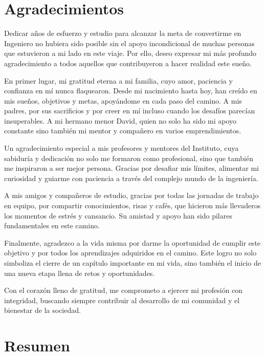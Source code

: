 \documentclass{report}
\begin{document}
	\newpage
	\chapter*{Agradecimientos}
	
	Dedicar años de esfuerzo y estudio para alcanzar la meta de convertirme en Ingeniero no hubiera sido posible sin el apoyo incondicional de muchas personas que estuvieron a mi lado en este viaje. Por ello, deseo expresar mi más profundo agradecimiento a todos aquellos que contribuyeron a hacer realidad este sueño.
	
	En primer lugar, mi gratitud eterna a mi familia, cuyo amor, paciencia y confianza en mí nunca flaquearon. Desde mi nacimiento hasta hoy, han creído en mis sueños, objetivos y metas, apoyándome en cada paso del camino. A mis padres, por sus sacrificios y por creer en mí incluso cuando los desafíos parecían insuperables. A mi hermano menor David, quien no solo ha sido mi apoyo constante sino también mi mentor y compañero en varios emprendimientos.
	
	Un agradecimiento especial a mis profesores y mentores del Instituto, cuya sabiduría y dedicación no solo me formaron como profesional, sino que también me inspiraron a ser mejor persona. Gracias por desafiar mis límites, alimentar mi curiosidad y guiarme con paciencia a través del complejo mundo de la ingeniería.
	
	A mis amigos y compañeros de estudio, gracias por todas las jornadas de trabajo en equipo, por compartir conocimientos, risas y cafés, que hicieron más llevaderos los momentos de estrés y cansancio. Su amistad y apoyo han sido pilares fundamentales en este camino.
	
	Finalmente, agradezco a la vida misma por darme la oportunidad de cumplir este objetivo y por todos los aprendizajes adquiridos en el camino. Este logro no solo simboliza el cierre de un capítulo importante en mi vida, sino también el inicio de una nueva etapa llena de retos y oportunidades.
	
	Con el corazón lleno de gratitud, me comprometo a ejercer mi profesión con integridad, buscando siempre contribuir al desarrollo de mi comunidad y el bienestar de la sociedad.
	
	\newpage
	\tableofcontents
	\newpage
	
	\chapter*{Resumen}
	
\end{document}
